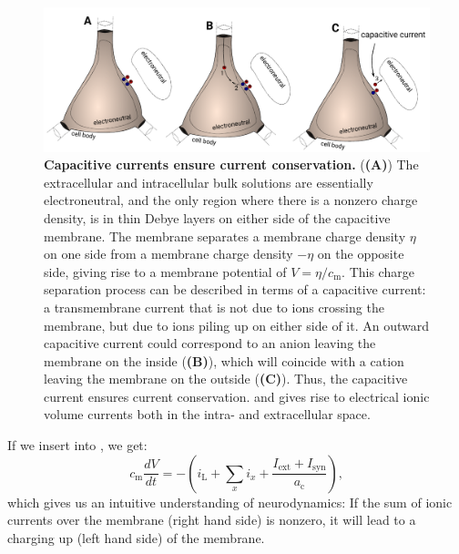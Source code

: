 \begin{figure}[!ht]
\begin{center}
\includegraphics[width=1.0\textwidth]{Figures/Neuron/capacitive_currents.pdf}
\end{center}
\caption{\textbf{Capacitive currents ensure current conservation.} (\textbf{(A)}) The extracellular and intracellular bulk solutions are essentially electroneutral, and the only region where there is a nonzero charge density, is in thin Debye layers on either side of the capacitive membrane. The membrane separates a membrane charge density $\eta$ on one side from a membrane charge density $-\eta$ on the opposite side, giving rise to a membrane potential of $V = \eta/c_{\mathrm{m}}$. 
 This charge separation process can be described in terms of a capacitive current: a transmembrane current that is not due to ions crossing the membrane, but due to ions piling up on either side of it.  An outward capacitive current could correspond to an anion leaving the membrane on the inside (\textbf{(B)}), which will coincide with a cation leaving the membrane on the outside (\textbf{(C)}). Thus, the capacitive current ensures current conservation. and gives rise to electrical ionic volume currents both in the intra- and extracellular space. 
}
\label{fig:Neuron:capacitive_currents}
\end{figure}

If we insert  into , we get:
\begin{equation}
c_{\mathrm{m}} \frac{dV}{dt} = -  ( i_{\mathrm{L}} + \sum_x{i_x} +  \frac{I_{\mathrm{ext}} + I_{\mathrm{syn}}}{a_\text{c}} ) ,
\label{eq:Neuron:singlecomp_capinserted}
\end{equation}
which gives us an intuitive understanding of neurodynamics: If the sum of ionic currents over the membrane (right hand side) is nonzero, it will lead to a charging up (left hand side) of the membrane.


